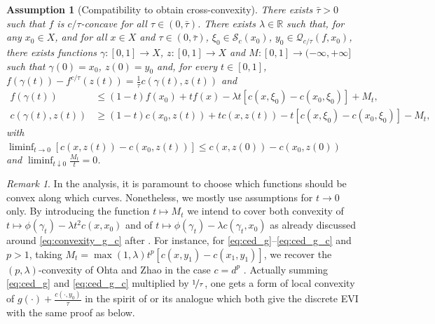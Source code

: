 \documentclass[reqno]{amsart}
\newcounter{results}[section]
\theoremstyle{plain}
\theoremstyle{remark}
\newtheorem{remark}[results]{Remark}
\theoremstyle{plain}
\newtheorem{assumption}[results]{Assumption}
\numberwithin{equation}{section}
\theoremstyle{remark}
\newcommand{\R}{\mathbb{R}}
\newcommand{\calQ}{\mathcal{Q}}
\newcommand{\YY}{X}
\begin{document}
\begin{assumption}[Compatibility to obtain cross-convexity]\label{ass:ced_cross-convex}
   There exists $\bar \tau>0$ such that $f$ is $c/\tau$-concave for all $\tau\in (0,\bar{\tau})$. There exists $\lambda\in\R$ such that, for any $x_0\in X$, and for all $x\in X$ and $\tau\in (0,\bar{\tau})$, $\xi_0\in \mathcal{S}_c(x_0)$, $y_0\in \calQ_{c/\tau}(f,x_0)$, there exists functions $\gamma:[0,1]\to X$, $z:[0,1]\to \YY$ and $M:[0,1]\to (-\infty, +\infty]$ such that $\gamma(0)=x_0$, $z(0)=y_0$ and, for every $t\in[0,1]$, $f(\gamma(t))-f^{c/\tau}(z(t))=\frac{1}{\tau}c(\gamma(t),z(t))$ and
    \begin{align}
        f(\gamma(t)) &\le (1-t)f(x_0)+tf(x)-\lambda t[c(x,\xi_0)-c(x_0,\xi_0)]+M_t, \label{eq:ced_f} \\
        c(\gamma(t),z(t)) &\ge (1-t)c(x_0,z(t))+tc(x,z(t))-t[c(x,\xi_0)-c(x_0,\xi_0)]-M_t, \label{eq:ced_f_c} 
    \end{align}
     with $\liminf_{t\to 0} [c(x,z(t))-c(x_0,z(t))]\le c(x,z(0))-c(x_0,z(0))$ and $\liminf_{t\downarrow 0}\frac{M_t}{t}=0$.
\end{assumption}
\begin{remark}\label{rmk:compatibility} In  the   analysis, it is paramount to choose which functions should be convex along which curves.  Nonetheless, we mostly use assumptions for $t \to 0$ only.  
By introducing the function $t \mapsto M_t$ we intend to cover both convexity of $t\mapsto \phi(\gamma_t) - \lambda t^2 c(x,x_0)$ and of $t\mapsto \phi(\gamma_t) - \lambda c(\gamma_t,x_0)$ as already discussed around  \eqref{eq:convexity_g_c} after . For instance, for \eqref{eq:ced_g}--\eqref{eq:ced_g_c} and $p>1$, taking $M_t= \max(1,\lambda) t^p[c(x,y_1)- c(x_1,y_1)]$, we recover the $(p,\lambda)$-convexity of Ohta and Zhao in the case $c=d^p$ \cite[Definition 4.1]{Ohta2023}. Actually summing \eqref{eq:ced_g} and \eqref{eq:ced_g_c} multiplied by $\nicefrac{1}{\tau}$, one gets a form of local convexity of $g(\cdot)+\frac{c(\cdot,y_0)}{\tau}$ in the spirit of \cite[Assumption 4.0.1]{ags08} or its analogue \cite[Assumption 4.3]{Ohta2023} which both give the discrete EVI with the same proof as below.


    
\end{remark}
\end{document}
